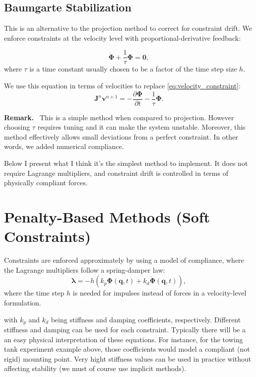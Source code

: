 \documentclass{article}
\newcommand{\mf}[1]{{\mathbf{#1}}}
\newenvironment{remark}{\begin{remarkbox}\textbf{Remark.}~}{\end{remarkbox}}
\begin{document}
\subsection{Baumgarte Stabilization}

This is an alternative to the projection method to correct for constraint drift.
We enforce constraints at the velocity level with proportional-derivative
feedback:

\begin{equation}
    \dot{\mf{\Phi}} + \frac{1}{\tau}\mf{\Phi} = \mf{0},
\end{equation}
where $\tau$ is a time constant usually chosen to be a factor of the time step
size $h$.

We use this equation in terms of velocities to replace \eqref{eq:velocity_constraint}:
\begin{equation}
    \mf{J}^n\mf{v}^{n+1} = -\frac{\partial\mf{\Phi}}{\partial t} - \frac{1}{\tau}\mf{\Phi}.
\end{equation}

\begin{remark}
This is a simple method when compared to projection. However choosing $\tau$
requires tuning and it can make the system unstable. Moreover, this method
effectively allows small deviations from a perfect constraint. In other words,
we added numerical compliance.
\end{remark}

Below I present what I think it's the simplest method to implement. It does not
require Lagrange multipliers, and constraint drift is controlled in terms of
physically compliant forces.

\section{Penalty-Based Methods (Soft Constraints)}

Constraints are enforced approximately by using a model of compliance, where the
Lagrange multipliers follow a spring-damper law:
\begin{equation}
    \bm{\lambda} = -h(k_p \mf{\Phi}(\mf{q}, t) + k_d \dot{\mf{\Phi}}(\mf{q}, t)),
\end{equation}
where the time step $h$ is needed for impulses instead of forces in a
velocity-level formulation.

with \( k_p \) and \( k_d \) being stiffness and damping coefficients,
respectively. Different stiffness and damping can be used for each constraint.
Typically there will be a an easy physical interpretation of these equations.
For instance, for the towing tank experiment example above, those coefficients
would model a compliant (not rigid) mounting point. Very hight stiffness values
can be used in practice without affecting stability (we must of course use
implicit methods).
\end{document}
